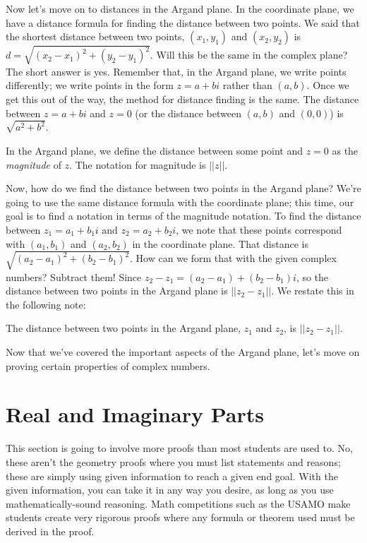 \documentclass[lang=en,11pt]{elegantbook}
\begin{document}
Now let's move on to distances in the Argand plane.  In the coordinate plane, we have a distance formula for finding the distance between two points.  We said that the shortest distance between two points, $(x_1,y_1)$ and $(x_2,y_2)$ is $d=\sqrt{\left(x_2-x_1\right)^2+\left(y_2-y_1\right)^2}$.  Will this be the same in the complex plane?  The short answer is yes.  Remember that, in the Argand plane, we write points differently; we write points in the form $z=a+bi$ rather than $(a,b)$.  Once we get this out of the way, the method for distance finding is the same.  The distance between $z=a+bi$ and $z=0$ (or the distance between $(a,b)$ and $(0,0)$) is $\sqrt{a^2+b^2}$.
\begin{note}
In the Argand plane, we define the distance between some point and $z=0$ as the \textit{magnitude} of $z$.  The notation for magnitude is $||z||$.
\end{note}
Now, how do we find the distance between two points in the Argand plane?  We're going to use the same distance formula with the coordinate plane; this time, our goal is to find a notation in terms of the magnitude notation.  To find the distance between $z_1=a_1+b_1i$ and $z_2=a_2+b_2i$, we note that these points correspond with $\left(a_1,b_1\right)$ and $\left(a_2,b_2\right)$ in the coordinate plane.  That distance is $\sqrt{\left(a_2-a_1\right)^2+\left(b_2-b_1\right)^2}$.  How can we form that with the given complex numbers?  Subtract them!  Since $z_2-z_1=\left(a_2-a_1\right)+\left(b_2-b_1\right)i$, so the distance between two points in the Argand plane is $||z_2-z_1||$.  We restate this in the following note:
\begin{note}
The distance between two points in the Argand plane, $z_1$ and $z_2$, is $||z_2-z_1||$.
\end{note}
\noindent Now that we've covered the important aspects of the Argand plane, let's move on proving certain properties of complex numbers.
\section{Real and Imaginary Parts}
\noindent This section is going to involve more proofs than most students are used to.  No, these aren't the geometry proofs where you must list statements and reasons; these are simply using given information to reach a given end goal.  With the given information, you can take it in any way you desire, as long as you use mathematically-sound reasoning.  Math competitions such as the USAMO make students create very rigorous proofs where any formula or theorem used must be derived in the proof.
\end{document}
